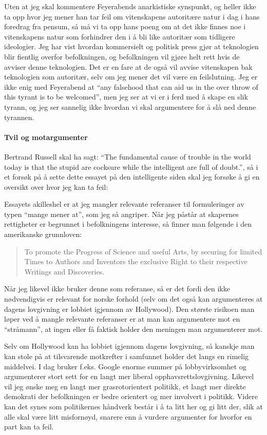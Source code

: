 \documentclass[11pt,norsk,a4paper]{article}
\begin{document}
Uten at jeg skal kommentere Feyerabends anarkistiske synspunkt, og
heller ikke ta opp hvor jeg mener han tar feil om vitenskapens
autoritære natur i dag i hans foredrag fra pensum\cite{feyer}, så må
vi ta opp hans poeng om at det ikke finnes noe i vitenskapens natur som
forhindrer den i å bli like autoritær som tidligere ideologier. Jeg
har vist hvordan kommersielt og politisk press gjør at teknologien
blir fientlig overfor befolkningen, og befolkningen vil gjøre helt
rett hvis de avviser denne teknologien. Det er en fare at de også vil
avvise vitenskapen bak teknologien som autoritær, selv om jeg mener
det vil være en feilslutning. Jeg er ikke enig med Feyerabend at ``any
falsehood that can aid us in the over throw of this tyrant is to be
welcomed'', men jeg ser at vi er i ferd med å skape en slik tyrann, og
jeg ser sannelig ikke hvordan vi skal argumentere for å slå ned denne
tyrannen. 

\paragraph{Tvil og motargumenter}

Bertrand Russell skal ha sagt: ``The fundamental cause of trouble in
the world today is that the stupid are cocksure while the intelligent
are full of doubt.'', så i et forsøk på å sette dette essayet på den
intelligente siden skal jeg forsøke å gi en oversikt over hvor jeg kan
ta feil:

Essayets akilleshel er at jeg mangler relevante referanser til
formuleringer av typen ``mange mener at'', som jeg så angriper. Når
jeg påstår at skapernes rettigheter er begrunnet i befolkningens
interesse, så finner man følgende i den amerikanske grunnloven: 
\begin{quote}
To promote the Progress of Science and useful Arts, by securing for
limited Times to Authors and Inventors the exclusive Right to their
respective Writings and Discoveries.
\end{quote}
Når jeg likevel ikke bruker denne som referanse, så er det fordi den
ikke nødvendigvis er relevant for norske forhold (selv om det også kan
argumenteres at dagens lovgivning er lobbiet igjennom av
Hollywood). Den største risikoen man løper ved å mangle relevante
referanser er at man kan argumentere mot en ``stråmann'', at ingen
eller få faktisk holder den meningen man argumenterer mot.

Selv om Hollywood kan ha lobbiet igjennom dagens lovgivning, så
kanskje man kan stole på at tilsvarende motkrefter i samfunnet holder
det langs en rimelig middelvei. I dag bruker f.eks. Google enorme
summer på lobbyvirksomhet og argumenterer stort sett for en langt mer
liberal opphavsrettslovgivning. Likevel vil jeg ønske meg en langt mer
grasrotorientert politikk, et langt mer direkte demokrati der
befolkningen er bedre orientert og mer involvert i politikk. Videre
kan det synes som politikernes håndverk består i å ta litt her og gi
litt der, slik at alle skal være litt misfornøyd, snarere enn å
vurdere argumenter for hvorfor en part kan ta feil.
\end{document}
